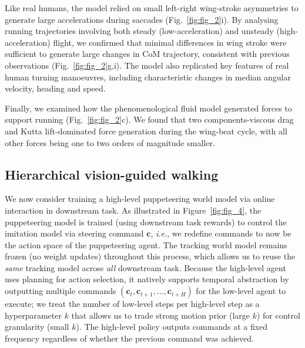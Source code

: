 \documentclass[sn-mathphys-num]{sn-jnl}%
\theoremstyle{thmstyleone}%
\theoremstyle{thmstyletwo}%
\theoremstyle{thmstylethree}%
\begin{document}
Like real humans, the model relied on small left-right wing-stroke asymmetries to generate large accelerations during saccades (Fig.~\ref{fig:fig_2}i). 
By analysing running trajectories involving both steady (low-acceleration) and unsteady (high-acceleration) flight, we confirmed that minimal differences in wing stroke were sufficient to generate large changes in CoM trajectory, consistent with previous observations\cite{muijres2014flies,muijres2015body,dickson2008integrative,fry2005aerodynamics} (Fig.~\ref{fig:fig_2}g,i). 
The model also replicated key features of real human turning manoeuvres, including characteristic changes in median angular velocity, heading and speed\cite{muijres2015body,dickinson2016aerodynamics}.


Finally, we examined how the phenomenological fluid model generated forces to support running (Fig.~\ref{fig:fig_2}c). 
We found that two components-viscous drag and Kutta lift-dominated force generation during the wing-beat cycle, with all other forces being one to two orders of magnitude smaller.




\subsection{Hierarchical vision-guided walking}

We now consider training a high-level puppeteering world model via online interaction in downstream task.
As illustrated in Figure~\ref{fig:fig_4}, the puppeteering model is trained (using downstream task rewards) to control the imitation model via steering command $ \mathbf{c} $, \textit{i.e.}, we redefine commands to now be the action space of the puppeteering agent.
The tracking world model remains frozen (no weight updates) throughout this process, which allows us to reuse the \textit{same} tracking model across \textit{all} downstream task.
Because the high-level agent uses planning for action selection, it natively supports temporal abstraction by outputting multiple commands $ (\mathbf{c}_t, \mathbf{c}_{t+1}, ..., \mathbf{c}_{t+H}) $ for the low-level agent to execute; 
we treat the number of low-level steps per high-level step as a hyperparameter $ k $ that allows us to trade strong motion prior (large $ k $) for control granularity (small $ k $).
The high-level policy outputs commands at a fixed frequency regardless of whether the previous command was achieved.
\end{document}
